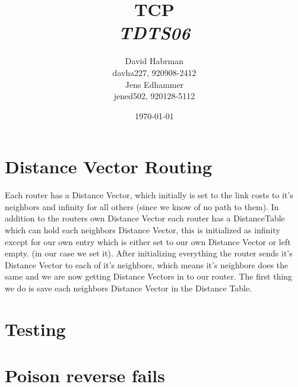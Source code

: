 \documentclass[10pt]{article}
\title{TCP\\
\emph{TDTS06}}
\author{David Habrman \\ davha227, 920908-2412\\
Jens Edhammer \\ jened502, 920128-5112 }
\date{\today}
\begin{document}
\maketitle

\newpage
\tableofcontents
\newpage

\section{Distance Vector Routing}
Each router has a Distance Vector, which initially is set to the link costs to it's neighbors and infinity for all others (since we know of no path to them). In addition to the routers own Distance Vector each router has a DistanceTable which can hold each neighbors Distance Vector, this is initialized as infinity except for our own entry which is either set to our own Distance Vector or left empty. (in our case we set it). After initializing everything the router sends it's Distance Vector to each of it's neighbors, which means it's neighbors does the same and we are now getting Distance Vectors in to our router. The first thing we do is save each neighbors Distance Vector in the Distance Table. 

\section{Testing}


\section{Poison reverse fails}
\end{document}
